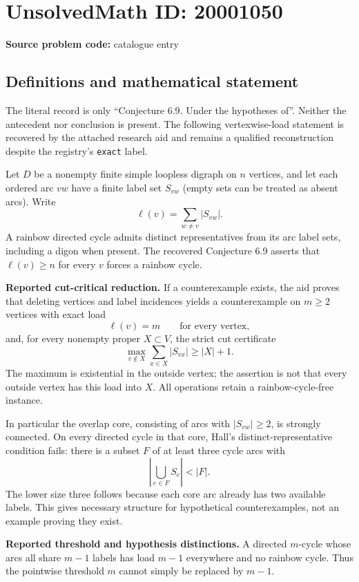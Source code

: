 \documentclass[11pt]{article}
\begin{document}
\section*{UnsolvedMath ID: 20001050}
\textbf{Source problem code:} catalogue entry
\subsection{Definitions and mathematical statement}
The literal record is only ``Conjecture 6.9. Under the hypotheses of''. Neither the antecedent nor conclusion is present. The following vertexwise-load statement is recovered by the attached research aid and remains a qualified reconstruction despite the registry's \texttt{exact} label.

Let $D$ be a nonempty finite simple loopless digraph on $n$ vertices, and let each ordered arc $vw$ have a finite label set $S_{vw}$ (empty sets can be treated as absent arcs). Write
\[
 \ell(v)=\sum_{w\ne v}|S_{vw}|.
\]
A rainbow directed cycle admits distinct representatives from its arc label sets, including a digon when present. The recovered Conjecture 6.9 asserts that $\ell(v)\geq n$ for every $v$ forces a rainbow cycle.

\textbf{Reported cut-critical reduction.} If a counterexample exists, the aid proves that deleting vertices and label incidences yields a counterexample on $m\geq2$ vertices with exact load
\[
 \ell(v)=m\qquad\text{for every vertex},
\]
and, for every nonempty proper $X\subset V$, the strict cut certificate
\[
 \max_{v\notin X}\sum_{x\in X}|S_{vx}|\geq|X|+1.
\]
The maximum is existential in the outside vertex; the assertion is not that every outside vertex has this load into $X$. All operations retain a rainbow-cycle-free instance.

In particular the overlap core, consisting of arcs with $|S_{vw}|\geq2$, is strongly connected. On every directed cycle in that core, Hall's distinct-representative condition fails: there is a subset $F$ of at least three cycle arcs with
\[
 \left|\bigcup_{e\in F}S_e\right|<|F|.
\]
The lower size three follows because each core arc already has two available labels. This gives necessary structure for hypothetical counterexamples, not an example proving they exist.

\textbf{Reported threshold and hypothesis distinctions.} A directed $m$-cycle whose arcs all share $m-1$ labels has load $m-1$ everywhere and no rainbow cycle. Thus the pointwise threshold $m$ cannot simply be replaced by $m-1$.
\end{document}
